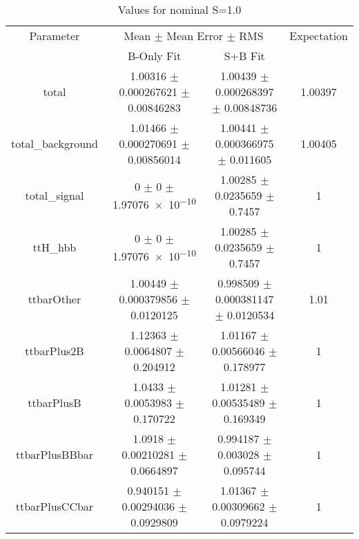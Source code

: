\begin{table}
\centering
\caption{Values for nominal S=1.0}
\begin{tabular}{cccc}
\toprule
Parameter & \multicolumn{2}{c}{Mean $\pm$ Mean Error $\pm$ RMS} & Expectation\\
 & B-Only Fit & S+B Fit & \\
\midrule
total & \num{1.00316} $\pm$ \num{0.000267621} $\pm$ \num{0.00846283} & \num{1.00439} $\pm$ \num{0.000268397} $\pm$ \num{0.00848736} & \num{1.00397}\\
total\_background & \num{1.01466} $\pm$ \num{0.000270691} $\pm$ \num{0.00856014} & \num{1.00441} $\pm$ \num{0.000366975} $\pm$ \num{0.011605} & \num{1.00405}\\
total\_signal & \num{0} $\pm$ \num{0} $\pm$ \num{1.97076e-10} & \num{1.00285} $\pm$ \num{0.0235659} $\pm$ \num{0.7457} & \num{1}\\
ttH\_hbb & \num{0} $\pm$ \num{0} $\pm$ \num{1.97076e-10} & \num{1.00285} $\pm$ \num{0.0235659} $\pm$ \num{0.7457} & \num{1}\\
ttbarOther & \num{1.00449} $\pm$ \num{0.000379856} $\pm$ \num{0.0120125} & \num{0.998509} $\pm$ \num{0.000381147} $\pm$ \num{0.0120534} & \num{1.01}\\
ttbarPlus2B & \num{1.12363} $\pm$ \num{0.0064807} $\pm$ \num{0.204912} & \num{1.01167} $\pm$ \num{0.00566046} $\pm$ \num{0.178977} & \num{1}\\
ttbarPlusB & \num{1.0433} $\pm$ \num{0.0053983} $\pm$ \num{0.170722} & \num{1.01281} $\pm$ \num{0.00535489} $\pm$ \num{0.169349} & \num{1}\\
ttbarPlusBBbar & \num{1.0918} $\pm$ \num{0.00210281} $\pm$ \num{0.0664897} & \num{0.994187} $\pm$ \num{0.003028} $\pm$ \num{0.095744} & \num{1}\\
ttbarPlusCCbar & \num{0.940151} $\pm$ \num{0.00294036} $\pm$ \num{0.0929809} & \num{1.01367} $\pm$ \num{0.00309662} $\pm$ \num{0.0979224} & \num{1}\\
\bottomrule
\end{tabular}
\end{table}